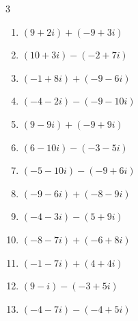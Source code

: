 \begin{multicols}{3}
\begin{enumerate}
        \phantom{$\displaystyle =-10-7i$}

  \item $\displaystyle (9+2i) + (-9+3i)$

        \phantom{$\displaystyle =5i$}

  \item $\displaystyle (10+3i) - (-2+7i)$

        \phantom{$\displaystyle =12-4i$}

  \item $\displaystyle (-1+8i) + (-9-6i)$

        \phantom{$\displaystyle =-10+2i$}

  \item $\displaystyle (-4-2i) - (-9-10i)$

        \phantom{$\displaystyle =5+8i$}

  \item $\displaystyle (9-9i) + (-9+9i)$

        \phantom{$\displaystyle =0$}

  \item $\displaystyle (6-10i) - (-3-5i)$

        \phantom{$\displaystyle =9-5i$}

  \item $\displaystyle (-5-10i) - (-9+6i)$

        \phantom{$\displaystyle =4-16i$}

  \item $\displaystyle (-9-6i) + (-8-9i)$

        \phantom{$\displaystyle =-17-15i$}

  \item $\displaystyle (-4-3i) - (5+9i)$

        \phantom{$\displaystyle =-9-12i$}

  \item $\displaystyle (-8-7i) + (-6+8i)$

        \phantom{$\displaystyle =-14+i$}

  \item $\displaystyle (-1-7i) + (4+4i)$

        \phantom{$\displaystyle =3-3i$}

  \item $\displaystyle (9-i) - (-3+5i)$

        \phantom{$\displaystyle =12-6i$}

  \item $\displaystyle (-4-7i) - (-4+5i)$


\end{enumerate}
\end{multicols}
